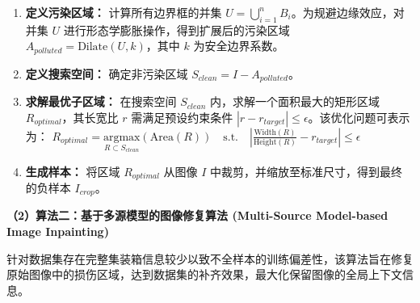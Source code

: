 \documentclass[
]{article}
\begin{document}
\begin{enumerate}
\def\labelenumi{\arabic{enumi}.}
\item
  \textbf{定义污染区域：} 计算所有边界框的并集
  \(U = \bigcup_{i=1}^{n} B_i\)。为规避边缘效应，对并集 \(U\)
  进行形态学膨胀操作，得到扩展后的污染区域
  \(A_{polluted} = \text{Dilate}(U, k)\)，其中 \(k\) 为安全边界系数。
\item
  \textbf{定义搜索空间：} 确定非污染区域
  \(S_{clean} = I - A_{polluted}\)。
\item
  \textbf{求解最优子区域：} 在搜索空间 \(S_{clean}\)
  内，求解一个面积最大的矩形区域 \(R_{optimal}\)，其长宽比 \(r\)
  需满足预设约束条件
  \(|r - r_{target}| \le \epsilon\)。该优化问题可表示为：
  \(R_{optimal} = \underset{R \subset S_{clean}}{\text{argmax}} \left( \text{Area}(R) \right) \quad \text{s.t.} \quad \left| \frac{\text{Width}(R)}{\text{Height}(R)} - r_{target} \right| \le \epsilon\)
\item
  \textbf{生成样本：} 将区域 \(R_{optimal}\) 从图像 \(I\)
  中裁剪，并缩放至标准尺寸，得到最终的负样本 \(I_{crop}\)。
\end{enumerate}

\textbf{（2）算法二：基于多源模型的图像修复算法 (Multi-Source
Model-based Image Inpainting)}

针对数据集存在完整集装箱信息较少以致不全样本的训练偏差性，该算法旨在修复原始图像中的损伤区域，达到数据集的补齐效果，最大化保留图像的全局上下文信息。
\end{document}
